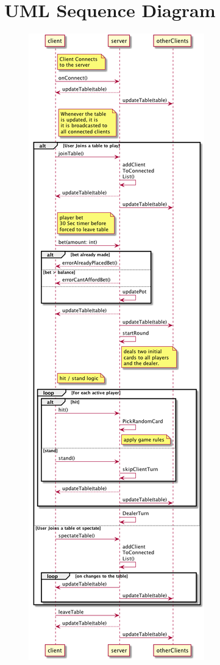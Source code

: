 \documentclass[a4paper]{article}
\begin{document}
\section{UML Sequence Diagram}
\begin{figure}[H]
  \centering
\includegraphics[height=\textheight]{sequence}
\end{figure}
\end{document}
